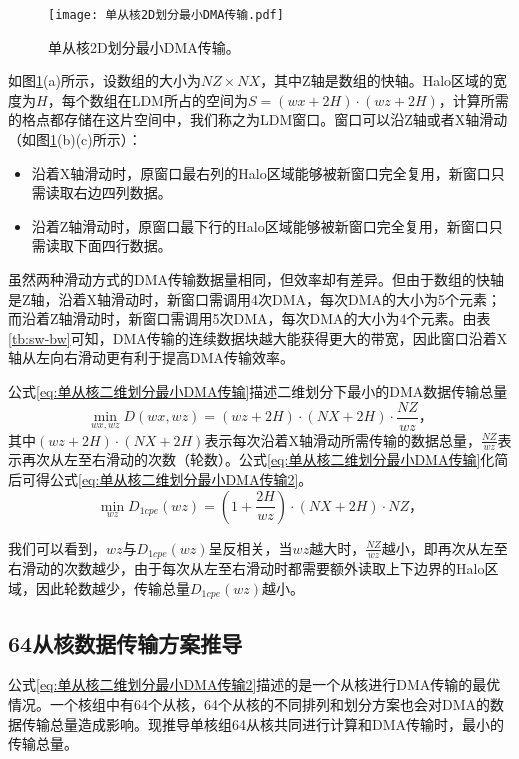 \begin{figure}[ht]
  \centering
  \texttt{[image: 单从核2D划分最小DMA传输.pdf]}
  \caption{单从核2D划分最小DMA传输。}
  \label{fig:cpe-2d-derive}
\end{figure}

如图\ref{fig:cpe-2d-derive}(a)所示，设数组的大小为$NZ\times NX$，其中Z轴是数组的快轴。Halo区域的宽度为$H$，每个数组在LDM所占的空间为$S=(wx+2H)\cdot(wz+2H)$，计算所需的格点都存储在这片空间中，我们称之为LDM窗口。窗口可以沿Z轴或者X轴滑动（如图\ref{fig:cpe-2d-derive}(b)(c)所示）：
\begin{itemize}
  \item 沿着X轴滑动时，原窗口最右列的Halo区域能够被新窗口完全复用，新窗口只需读取右边四列数据。
  \item 沿着Z轴滑动时，原窗口最下行的Halo区域能够被新窗口完全复用，新窗口只需读取下面四行数据。
\end{itemize}

虽然两种滑动方式的DMA传输数据量相同，但效率却有差异。但由于数组的快轴是Z轴，沿着X轴滑动时，新窗口需调用4次DMA，每次DMA的大小为5个元素；而沿着Z轴滑动时，新窗口需调用5次DMA，每次DMA的大小为4个元素。由表\ref{tb:sw-bw}可知，DMA传输的连续数据块越大能获得更大的带宽，因此窗口沿着X轴从左向右滑动更有利于提高DMA传输效率。

公式\ref{eq:单从核二维划分最小DMA传输}描述二维划分下最小的DMA数据传输总量
\begin{equation}
  \min_{wx,wz} D(wx,wz) = (wz+2H)\cdot(NX+2H)\cdot\frac{NZ}{wz}，
  \label{eq:单从核二维划分最小DMA传输}
\end{equation}
其中$(wz+2H)\cdot(NX+2H)$表示每次沿着X轴滑动所需传输的数据总量，$\frac{NZ}{wz}$表示再次从左至右滑动的次数（轮数）。公式\ref{eq:单从核二维划分最小DMA传输}化简后可得公式\ref{eq:单从核二维划分最小DMA传输2}。
\begin{equation}
  \min_{wz} D_{1cpe}(wz) = (1+\frac{2H}{wz})\cdot(NX+2H)\cdot NZ，
  \label{eq:单从核二维划分最小DMA传输2}
\end{equation}

我们可以看到，$wz$与$D_{1cpe}(wz)$呈反相关，当$wz$越大时，$\frac{NZ}{wz}$越小，即再次从左至右滑动的次数越少，由于每次从左至右滑动时都需要额外读取上下边界的Halo区域，因此轮数越少，传输总量$D_{1cpe}(wz)$越小。

\subsection{64从核数据传输方案推导}
公式\ref{eq:单从核二维划分最小DMA传输2}描述的是一个从核进行DMA传输的最优情况。一个核组中有64个从核，64个从核的不同排列和划分方案也会对DMA的数据传输总量造成影响。现推导单核组64从核共同进行计算和DMA传输时，最小的传输总量。

